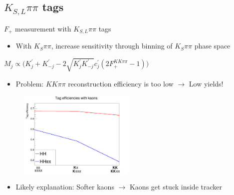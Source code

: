 \documentclass{beamer}
\begin{document}
\subsection{\texorpdfstring{$K_{S, L}\pi\pi$}{K0pipi} tags}

\begin{frame}{$F_+$ measurement with $K_{S, L}\pi\pi$ tags}
  \begin{itemize}
    \item{With $K_S\pi\pi$, increase sensitivity through binning of $K_S\pi\pi$ phase space}
  \end{itemize}
  \begin{center}
    $M_j\propto\big(K^\prime_j + K^\prime_{-j} - 2\sqrt{K^\prime_jK^\prime_{-j}}c^\prime_j(2F_+^{KK\pi\pi} - 1)\big)$
  \end{center}
  \begin{itemize}
    \item{Problem: $KK\pi\pi$ reconstruction efficiency is too low $\to$ Low yields!}
  \end{itemize}
  \begin{figure}
    \includegraphics[width = 0.5\textwidth]{Plots/KaonTrackingEfficiency.png}
  \end{figure}
  \begin{itemize}
    \item{Likely explanation: Softer kaons $\to$ Kaons get stuck inside tracker}
  \end{itemize}
\end{frame}
\end{document}
